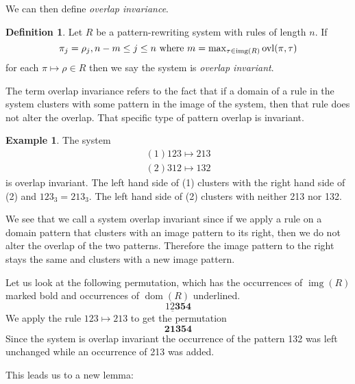 \documentclass[a4paper, 11pt, english]{article}
\newcommand{\patternrule}{ \mapsto \!}
\theoremstyle{definition}
\newtheorem{definition}[theorem]{Definition}
\newtheorem{example}[theorem]{Example}
\DeclareMathOperator{\dom}{dom}
\DeclareMathOperator{\img}{img}
\DeclareMathOperator{\ovl}{ovl}
\begin{document}
We can then define \emph{overlap invariance}.

\begin{definition}
    Let $R$ be a pattern-rewriting system with rules of length $n$. If
    \[
        \pi_j = \rho_j, n-m \leq j \leq n \  \textnormal{where}
        \ m = \max\nolimits_{\tau \in \img(R)} \ovl(\pi, \tau)
    \]
    for each $\pi \patternrule \rho \in R$ then we say the system is \emph{overlap invariant}.
\end{definition}

The term overlap invariance refers to the fact that if a domain of a rule in the system clusters
with some pattern in the image of the system, then that rule does not alter the overlap. That
specific type of pattern overlap is invariant.

\begin{example}
  The system
  \begin{align}
    (1) 123 \patternrule 213 \\
    (2) 312 \patternrule 132
  \end{align}
  is overlap invariant. The left hand side of (1) clusters with the right hand side of (2) and 
  $123_3 = 213_3$. The left hand side of (2) clusters with neither 213 nor 132.

  We see that we call a system overlap invariant since if we apply a rule on a domain pattern that clusters
  with an image pattern to its right, then we do not alter the overlap of the two patterns.
  Therefore the image pattern to the right stays the same and clusters with a new image pattern.
  
  Let us look at the following permutation, which has the occurrences of $\img(R)$ marked bold and
  occurrences of $\dom(R)$ underlined.
  \[
    \underline{12\bm{3}}\bm{54}
  \]
  We apply the rule $123 \patternrule 213$ to get the permutation
  \[
    \bm{21\bm{3}}\bm{54}
  \]
  Since the system is overlap invariant the occurrence of the pattern 132 was left unchanged while
  an occurrence of 213 was added.
\end{example}

This leads us to a new lemma:
\end{document}
